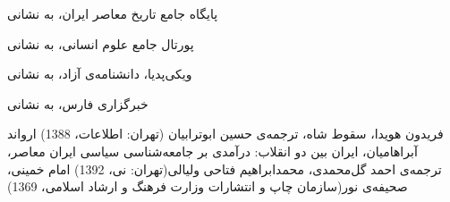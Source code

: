 \documentclass{article}
\begin{document}
\begin{thebibliography}{9}

\bibitem{}
پایگاه جامع تاریخ معاصر ایران، به نشانی

\bibitem{}
پورتال جامع علوم انسانی، به نشانی 

\bibitem{}
ویکی‌پدیا، دانشنامه‌ی آزاد، به نشانی

\bibitem{}
خبرگزاری فارس، به نشانی

\bibitem{}
فریدون هویدا، سقوط شاه، ترجمه‌ی حسین ابوترابیان (تهران: اطلاعات، 1388)
\bibitem{}
ارواند آبراهامیان، ایران بین دو انقلاب: درآمدی بر جامعه‌شناسی سیاسی ایران معاصر، ترجمه‌ی احمد گل‌محمدی، محمدابراهیم فتاحی ولیالی(تهران: نی، 1392)
\bibitem{}
امام خمینی، صحیفه‌ی نور(سازمان چاپ و انتشارات وزارت فرهنگ و ارشاد اسلامی، 1369)

\end{thebibliography}
\end{document}
